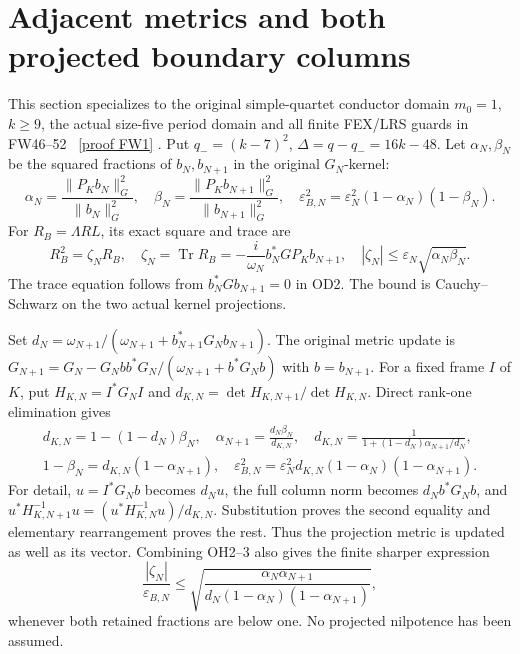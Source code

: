 \documentclass[11pt]{article}
\newcommand{\Tr}{\operatorname{Tr}}\newcommand{\diag}{\operatorname{diag}}
\newcommand{\eps}{\varepsilon}
\begin{document}
\section{Adjacent metrics and both projected boundary columns}
This section specializes to the original simple-quartet conductor
domain $m_0=1$, $k\ge9$, the actual size-five period domain and all
finite FEX/LRS guards in FW46--52 \cite{FW}%
~\href{https://github.com/KokunoYumeto/zeta-function-research-reader/blob/5992ad50c0f2a06921f1fcaded7b4e38097c0739/workbenches/splitzero-tandem/continuations/20260920-original-kernel-mixed-determinants/providers/FULL_WINDOW_SOURCE_PRODUCTS.tex\#L28}{[proof FW1]}%
{}. Put $q_-=(k-7)^2$,
$\Delta=q-q_-=16k-48$. Let $\alpha_N,\beta_N$ be the squared
fractions of $b_N,b_{N+1}$ in the original $G_N$-kernel:
\begin{equation}\tag{OH1}
 \alpha_N=\frac{\|P_Kb_N\|_G^2}{\|b_N\|_G^2},\quad
 \beta_N=\frac{\|P_Kb_{N+1}\|_G^2}{\|b_{N+1}\|_G^2},\quad
 \eps_{B,N}^2=\eps_N^2(1-\alpha_N)(1-\beta_N).
\end{equation}
For $R_B=\Lambda RL$, its exact square and trace are
\begin{equation}\tag{OH2}
 R_B^2=\zeta_NR_B,\quad
 \zeta_N=\Tr R_B=-\frac{i}{\omega_N}b_N^*GP_Kb_{N+1},
 \quad |\zeta_N|\le\eps_N\sqrt{\alpha_N\beta_N}.
\end{equation}
The trace equation follows from $b_N^*Gb_{N+1}=0$ in OD2. The bound
is Cauchy--Schwarz on the two actual kernel projections.

Set $d_N=\omega_{N+1}/(\omega_{N+1}+b_{N+1}^*G_Nb_{N+1})$.
The original metric update is
$G_{N+1}=G_N-G_Nbb^*G_N/(\omega_{N+1}+b^*G_Nb)$ with $b=b_{N+1}$.
For a fixed frame $I$ of $K$, put $H_{K,N}=I^*G_NI$ and
$d_{K,N}=\det H_{K,N+1}/\det H_{K,N}$. Direct rank-one elimination
gives
\begin{equation}\tag{OH3}\begin{gathered}
 d_{K,N}=1-(1-d_N)\beta_N,\quad
 \alpha_{N+1}=\frac{d_N\beta_N}{d_{K,N}},\quad
 d_{K,N}=\frac1{1+(1-d_N)\alpha_{N+1}/d_N},\\
 1-\beta_N=d_{K,N}(1-\alpha_{N+1}),\quad
 \boxed{\eps_{B,N}^2=\eps_N^2d_{K,N}
              (1-\alpha_N)(1-\alpha_{N+1}).}
\end{gathered}\end{equation}
For detail, $u=I^*G_Nb$ becomes $d_Nu$, the full column norm becomes
$d_Nb^*G_Nb$, and
$u^*H_{K,N+1}^{-1}u=(u^*H_{K,N}^{-1}u)/d_{K,N}$.
Substitution proves the second equality and elementary rearrangement
proves the rest. Thus the projection metric is updated as well as its
vector. Combining OH2--3 also gives the finite sharper expression
\begin{equation}\tag{OH4}
 \frac{|\zeta_N|}{\eps_{B,N}}
 \le\sqrt{\frac{\alpha_N\alpha_{N+1}}
 {d_N(1-\alpha_N)(1-\alpha_{N+1})}},
\end{equation}
whenever both retained fractions are below one. No projected
nilpotence has been assumed.
\end{document}

